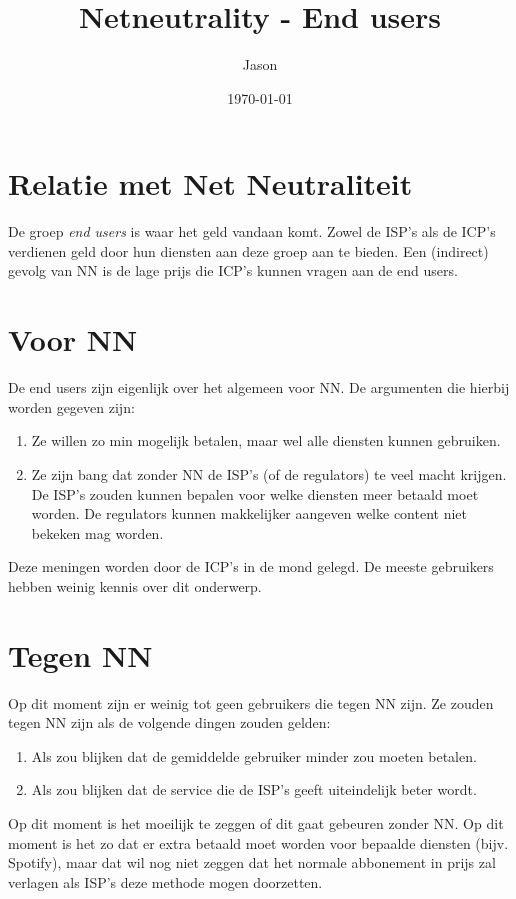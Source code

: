 \documentclass{article}
\title{Netneutrality - End users}
\author{Jason}
\date{\today}
\begin{document}
\maketitle

\section{Relatie met Net Neutraliteit}
De groep \emph{end users} is waar het geld vandaan komt. Zowel de ISP's als de ICP's verdienen geld door hun diensten aan deze groep aan te bieden. Een (indirect) gevolg van NN is de lage prijs die ICP's kunnen vragen aan de end users.

\section{Voor NN}
De end users zijn eigenlijk over het algemeen voor NN. De argumenten die hierbij worden gegeven zijn:

\begin{enumerate}
\item Ze willen zo min mogelijk betalen, maar wel alle diensten kunnen gebruiken.
\item Ze zijn bang dat zonder NN de ISP's (of de regulators) te veel macht krijgen. De ISP's zouden kunnen bepalen voor welke diensten meer betaald moet worden. De regulators kunnen makkelijker aangeven welke content niet bekeken mag worden.
\end{enumerate}

Deze meningen worden door de ICP's in de mond gelegd. De meeste gebruikers hebben weinig kennis over dit onderwerp.

\section{Tegen NN}
Op dit moment zijn er weinig tot geen gebruikers die tegen NN zijn. Ze zouden tegen NN zijn als de volgende dingen zouden gelden:

\begin{enumerate}
\item Als zou blijken dat de gemiddelde gebruiker minder zou moeten betalen.
\item Als zou blijken dat de service die de ISP's geeft uiteindelijk beter wordt.
\end{enumerate}

Op dit moment is het moeilijk te zeggen of dit gaat gebeuren zonder NN. Op dit moment is het zo dat er extra betaald moet worden voor bepaalde diensten (bijv. Spotify), maar dat wil nog niet zeggen dat het normale abbonement in prijs zal verlagen als ISP's deze methode mogen doorzetten.
\end{document}
